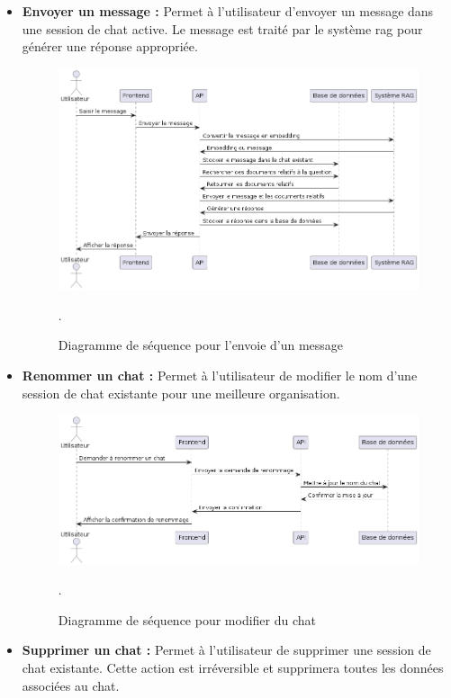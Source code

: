 \begin{itemize}
    \item \textbf{Envoyer un message :} Permet à l'utilisateur d'envoyer un message dans une session de chat active. Le message est traité par le système \ac{rag} pour générer une réponse appropriée.

    \begin{figure}[H]
        \centering
        \includegraphics[width=15cm]{gfx/fig-send-message-fig.png}
        \caption{Diagramme de séquence pour l'envoie d'un message}.
        \label{fig:send-message-seq}
    \end{figure}

    \newpage
    \item \textbf{Renommer un chat :} Permet à l'utilisateur de modifier le nom d'une session de chat existante pour une meilleure organisation.

    \begin{figure}[H]
        \centering
        \includegraphics[width=15cm]{gfx/fig-rename-chat-seq.png}
        \caption{Diagramme de séquence pour modifier du chat}.
        \label{fig:rename-chat-seq}
    \end{figure}

    \item \textbf{Supprimer un chat :} Permet à l'utilisateur de supprimer une session de chat existante. Cette action est irréversible et supprimera toutes les données associées au chat.


\end{itemize}
